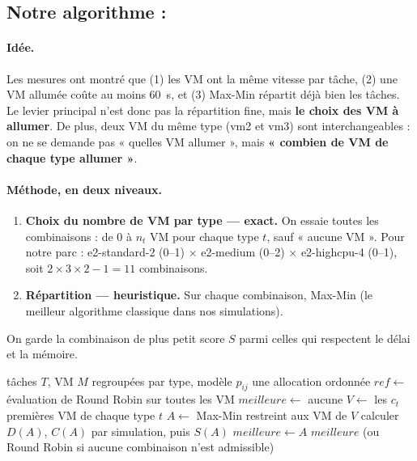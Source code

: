 \subsection{Notre algorithme : \sel}

\paragraph{Idée.} Les mesures ont montré que (1) les VM ont la même vitesse par
tâche, (2) une VM allumée coûte au moins 60~s, et (3) Max-Min répartit déjà bien
les tâches. Le levier principal n'est donc pas la répartition fine, mais
\textbf{le choix des VM à allumer}. De plus, deux VM du même type (vm2 et vm3)
sont interchangeables : on ne se demande pas « quelles VM allumer », mais
\textbf{« combien de VM de chaque type allumer »}.

\paragraph{Méthode, en deux niveaux.}
\begin{enumerate}
  \item \textbf{Choix du nombre de VM par type — exact.} On essaie toutes les
        combinaisons : de 0 à $n_t$ VM pour chaque type $t$, sauf « aucune VM ».
        Pour notre parc : e2-standard-2 (0–1) $\times$ e2-medium (0–2) $\times$
        e2-highcpu-4 (0–1), soit $2 \times 3 \times 2 - 1 = 11$ combinaisons.
  \item \textbf{Répartition — heuristique.} Sur chaque combinaison, Max-Min
        (le meilleur algorithme classique dans nos simulations).
\end{enumerate}
On garde la combinaison de plus petit score $S$ parmi celles qui respectent le
délai et la mémoire.

\begin{algorithm}[H]
\caption{\sel}
\begin{algorithmic}[1]
\Require tâches $T$, VM $M$ regroupées par type, modèle $p_{ij}$
\Ensure une allocation ordonnée
\State $\mathit{ref} \gets$ évaluation de Round Robin sur toutes les VM 
\State $\mathit{meilleure} \gets$ aucune
  \State $V \gets$ les $c_t$ premières VM de chaque type $t$
  \State $A \gets$ Max-Min restreint aux VM de $V$
  \State calculer $D(A)$, $C(A)$ par simulation, puis $S(A)$
    \State $\mathit{meilleure} \gets A$
  \EndIf
\EndFor
\State \Return $\mathit{meilleure}$ (ou Round Robin si aucune combinaison n'est admissible)
\end{algorithmic}
\end{algorithm}

